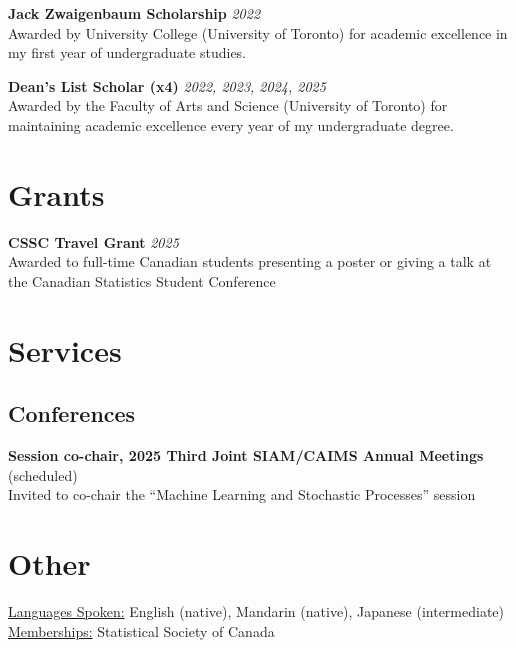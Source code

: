 \documentclass[11pt]{article}
\theoremstyle{definition}
\newcommand{\1}{\mathds 1}
\begin{document}
\textbf{Jack Zwaigenbaum Scholarship }\hfill \textit{2022}\\
Awarded by University College (University of Toronto) for academic excellence in my first year of undergraduate studies.

\textbf{Dean's List Scholar (x4)} \hfill \textit{2022, 2023, 2024, 2025}\\
Awarded by the Faculty of Arts and Science (University of Toronto) for maintaining academic excellence every year of my undergraduate degree. 

\section*{Grants}
\textbf{CSSC Travel Grant} \hfill \textit{2025}\\
Awarded to full-time Canadian students presenting a poster or giving a talk at the Canadian Statistics Student Conference

\section*{Services}
\subsection*{Conferences}
\textbf{Session co-chair, 2025 Third Joint SIAM/CAIMS Annual Meetings} (scheduled) \\
Invited to co-chair the ``Machine Learning and Stochastic Processes'' session 


\section*{Other}
\underline{Languages Spoken:} English (native), Mandarin (native), Japanese (intermediate)\\
\underline{Memberships:} Statistical Society of Canada
\end{document}
